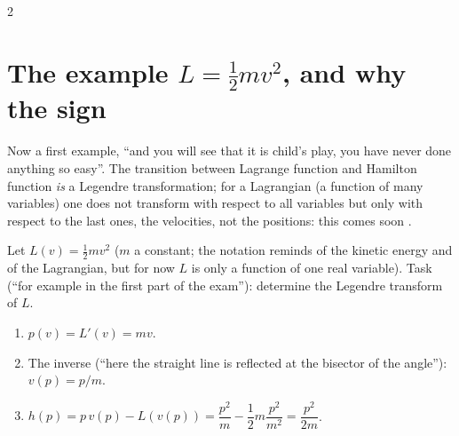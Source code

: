\begin{paracol}{2}
\section{The example $L=\tfrac12mv^2$, and why the sign}\label{sec:lt-example}

Now a first example, ``and you will see that it is child's play, you have never done anything so easy''. The transition between Lagrange function and Hamilton function \emph{is} a Legendre transformation; for a Lagrangian (a function of many variables) one does not transform with respect to all variables but only with respect to the last ones, the velocities, not the positions: this comes soon .

\begin{example}[$L(v)=\tfrac12mv^2$]\label{ex:lt-kin}
Let $L(v)=\tfrac12mv^2$ ($m$ a constant; the notation reminds of the kinetic energy and of the Lagrangian, but for now $L$ is only a function of one real variable). Task (``for example in the first part of the exam''): determine the Legendre transform of $L$.
\begin{enumerate}
  \item $p(v)=L'(v)=mv$.
  \item The inverse (``here the straight line is reflected at the bisector of the angle''): $v(p)=p/m$.
  \item $h(p)=p\,v(p)-L(v(p))=\dfrac{p^2}{m}-\dfrac12m\dfrac{p^2}{m^2}=\dfrac{p^2}{2m}$.
\end{enumerate}
\end{example}

\end{paracol}
